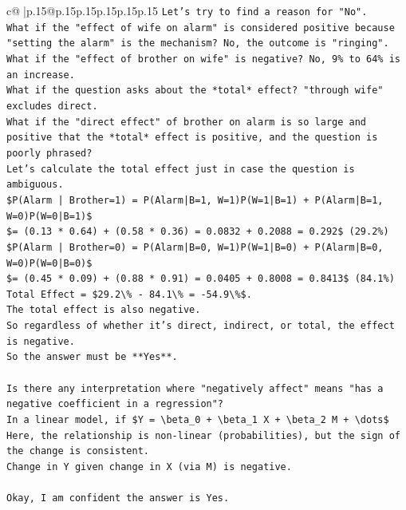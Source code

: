 \documentclass{article}
\begin{document}
{\begin{supertabular}{c@{$\;$}|p{.15\linewidth}@{}p{.15\linewidth}p{.15\linewidth}p{.15\linewidth}p{.15\linewidth}p{.15\linewidth}}
{{{\texttt{Let's try to find a reason for "No".} \\
\texttt{What if the "effect of wife on alarm" is considered positive because "setting the alarm" is the mechanism? No, the outcome is "ringing".} \\
\texttt{What if the "effect of brother on wife" is negative? No, 9\% to 64\% is an increase.} \\
\texttt{What if the question asks about the *total* effect? "through wife" excludes direct.} \\
\texttt{What if the "direct effect" of brother on alarm is so large and positive that the *total* effect is positive, and the question is poorly phrased?} \\
\texttt{Let's calculate the total effect just in case the question is ambiguous.} \\
\texttt{\$P(Alarm | Brother=1) = P(Alarm|B=1, W=1)P(W=1|B=1) + P(Alarm|B=1, W=0)P(W=0|B=1)\$} \\
\texttt{\$= (0.13 * 0.64) + (0.58 * 0.36) = 0.0832 + 0.2088 = 0.292\$ (29.2\%)} \\
\texttt{\$P(Alarm | Brother=0) = P(Alarm|B=0, W=1)P(W=1|B=0) + P(Alarm|B=0, W=0)P(W=0|B=0)\$} \\
\texttt{\$= (0.45 * 0.09) + (0.88 * 0.91) = 0.0405 + 0.8008 = 0.8413\$ (84.1\%)} \\
\texttt{Total Effect = \$29.2\textbackslash{}\% {-} 84.1\textbackslash{}\% = {-}54.9\textbackslash{}\%\$.} \\
\texttt{The total effect is also negative.} \\
\texttt{So regardless of whether it's direct, indirect, or total, the effect is negative.} \\
\texttt{So the answer must be **Yes**.} \\
\\ 
\texttt{Is there any interpretation where "negatively affect" means "has a negative coefficient in a regression"?} \\
\texttt{In a linear model, if \$Y = \textbackslash{}beta\_0 + \textbackslash{}beta\_1 X + \textbackslash{}beta\_2 M + \textbackslash{}dots\$} \\
\texttt{Here, the relationship is non{-}linear (probabilities), but the sign of the change is consistent.} \\
\texttt{Change in Y given change in X (via M) is negative.} \\
\\ 
\texttt{Okay, I am confident the answer is Yes.} \\
}}}
\end{supertabular}}
\end{document}
